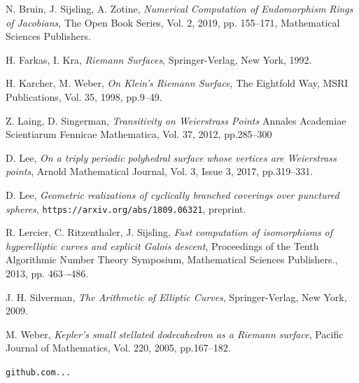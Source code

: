 \documentclass[12pt,reqno]{amsart}
\theoremstyle{definition}
\theoremstyle{remark}
\begin{document}






\begin{thebibliography}{20}


N. Bruin, J. Sijsling, A. Zotine,
\textit{Numerical Computation of Endomorphism Rings of Jacobians},
The Open Book Series,
Vol. 2, 2019, pp. 155--171, Mathematical Sciences Publishers.

H. Farkas, I. Kra,
\textit{Riemann Surfaces},
Springer-Verlag, New York, 1992.

H. Karcher, M. Weber,
\textit{On Klein's Riemann Surface},
The Eightfold Way, MSRI Publications, 
Vol. 35, 1998, pp.9--49.

Z. Laing, D. Singerman,
\textit{Transitivity on Weierstrass Points}
Annales Academiae Scientiarum Fennicae Mathematica,
Vol. 37, 2012, pp.285--300

D. Lee,
\textit{On a triply periodic polyhedral surface whose vertices are Weierstrass points},
Arnold Mathematical Journal, 
Vol. 3, Issue 3, 2017, pp.319--331.

D. Lee, 
\textit{Geometric realizations of cyclically branched coverings over punctured spheres},
\texttt{https://arxiv.org/abs/1809.06321}, preprint.

R. Lercier, C. Ritzenthaler, J. Sijsling,
\textit{Fast computation of isomorphisms of hyperelliptic curves and explicit Galois descent},
Proceedings of the Tenth Algorithmic Number Theory Symposium, Mathematical Sciences Publishers.,
2013, pp. 463–-486.

J. H. Silverman,
\textit{The Arithmetic of Elliptic Curves},
Springer-Verlag, New York, 2009.

M. Weber,
\textit{Kepler's small stellated dodecahedron as a Riemann surface},
Pacific Journal of Mathematics, 
Vol. 220, 2005, pp.167--182.

\texttt{github.com...}


\end{thebibliography}
\end{document}

